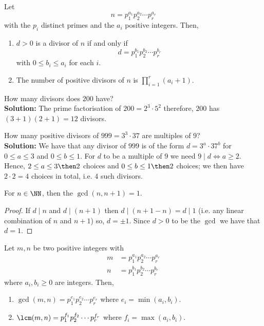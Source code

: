 \documentclass[12pt, a4paper]{article}
\begin{document}
\begin{mdlemma}
    Let 
    \[n=p_1^{a_1}p_2^{a_2}\cdots p_r^{a_r}\]
    with the \(p_i\) distinct primes and the \(a_i\) positive integers. Then,
    \begin{enumerate}
        \item \(d>0\) is a divisor of \(n\) if and only if \[d=p_1^{b_1}p_2^{b_2}\cdots p_r^{b_r}\] with \(0 \leq b_i \leq a_i\) for each \(i\).
        \item The number of positive divisors of \(n\) is \(\prod_{i=1}^r (a_i+1)\).
    \end{enumerate}
\end{mdlemma}

\begin{example}
    How many divisors does \(200\) have? \\
    \textbf{Solution:} The prime factorisation of \(200=2^3 \cdot 5^2\) therefore, \(200\) has \((3+1)(2+1) = 12\) divisors.
\end{example}

\begin{mdexample}
    How many positive divisors of \(999 = 3^3 \cdot 37\) are multiples of \(9\)? \\
    \textbf{Solution:} We have that any divisor of \(999\) is of the form \(d =3^a \cdot 37^b\) for \(0\leq a \leq 3\) and \(0 \leq b \leq 1\). For \(d\) to be a multiple of \(9\) we need \(9\mid d \iff a\geq 2\). Hence, \(2 \leq a \leq 3 \then 2\) choices and \(0\leq b \leq 1 \then 2 \) choices; we then have \(2\cdot 2 =4\) choices in total, i.e. \(4\) such divisors.
\end{mdexample}

\begin{proposition}
    For \(n\in \NN\), then the \(\gcd(n,n+1)=1\).
\end{proposition}

\begin{proof}
    If \(d\mid n\) and \(d\mid (n+1)\) then \(d\mid (n+1-n) =d\mid 1\) (i.e. any linear combination of \(n\) and \(n+1\)) so, \(d=\pm 1\). Since \(d>0\) to be the \(\gcd\) we have that \(d=1\).
\end{proof}

\begin{lemma}
    Let \(m,n\) be two positive integers with 
    \[\begin{aligned}
        m&=p_1^{a_1}p_2^{a_2}\cdots p_r^{a_r} \\
        n&=p_1^{b_1}p_2^{b_2}\cdots p_r^{b_r}
    \end{aligned}\]
    where \(a_i,b_i \geq 0\) are integers. Then,
    \begin{enumerate}
        \item \(\gcd(m,n)=p_1^{e_1}p_2^{e_2}\cdots p_r^{e_r}\) where \(e_i = \min(a_i,b_i)\).
        \item \(\lcm(m,n)=p_1^{f_1}p_2^{f_2}\cdots p_r^{f_r}\) where \(f_i = \max(a_i,b_i)\).
    \end{enumerate}
\end{lemma}
\end{document}
